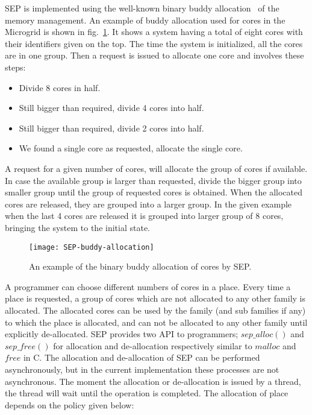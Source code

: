\documentclass{article}
\begin{document}
SEP is implemented using the well-known binary buddy
allocation~\cite{Peterson:1977:BS:359605.359626} of the memory management. An
example of buddy allocation used for cores in the Microgrid is shown
in fig.~\ref{fig:sep_buddy_allocation}. It shows a system having a total of eight
cores with their identifiers given on the top. The time the system is
initialized, all the cores are in one group. Then a request is issued to
allocate one core and involves these steps:

\begin{itemize}

\item Divide 8 cores in half.

\item Still bigger than required, divide 4 cores into half.

\item Still bigger than required, divide 2 cores into half.

\item We found a single core as requested, allocate the single core.

\end{itemize}

A request for a given number of cores, will allocate the group of cores if
available. In case the available group is larger than requested, divide the
bigger group into smaller group until the group of requested cores is obtained.
When the allocated cores are released, they are grouped into a larger group. In
the given example when the last 4 cores are released it is grouped into larger
group of 8 cores, bringing the system to the initial state.

\begin{figure}

\begin{centering}

\texttt{[image: SEP-buddy-allocation]}

\caption{\label{fig:sep_buddy_allocation}An example of the binary buddy
allocation of cores by SEP.}

\end{centering}

\end{figure}

A programmer can choose different numbers of cores in a place. Every time a
place is requested, a group of cores which are not allocated to any other
family is allocated. The allocated cores can be used by the family (and sub
families if any) to which the place is allocated, and can not be allocated to
any other family until explicitly de-allocated. SEP provides two API to
programmers; $sep\_alloc()$ and $sep\_free()$ for allocation and de-allocation
respectively similar to $malloc$ and $free$ in C. The allocation and
de-allocation of SEP can be performed asynchronously, but in the current
implementation these processes are not asynchronous. The moment the allocation
or de-allocation is issued by a thread, the thread will wait until the
operation is completed. The allocation of place depends on the policy given
below:
\end{document}
